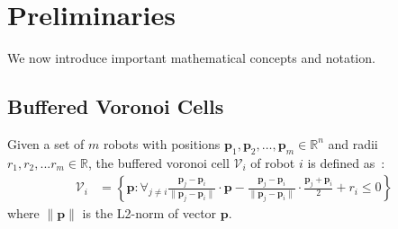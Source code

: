 \documentclass{svproc}
\newcommand{\vp}{\mathbf{p}}
\newcommand{\vf}{\mathbf{f}}
\newcommand{\vo}{\mathbf{o}}
\newcommand{\cV}{\mathcal{V}}
\newcommand{\cO}{\mathcal{O}}
\newcommand{\R}{\mathbb{R}} %
\begin{document}



\section{Preliminaries}

We now introduce important mathematical concepts and notation.

\subsection{Buffered Voronoi Cells} \label{bufferedVoronoi}
Given a set of $m$ robots with positions $\vp_1,\vp_2,\ldots,\vp_m \in \R^n$ and radii $r_1,r_2,...r_m \in \R$, the buffered voronoi cell $\cV_i$ of robot $i$ is defined as~\cite{bufferedVoronoiCells}:
\begin{align}
    \cV_i &= \left\{\vp : \forall_{j\neq i} \frac{\vp_j-\vp_i}{\|\vp_j-\vp_i\|}\cdot \vp - \frac{\vp_j-\vp_i}{\|\vp_j-\vp_i\|}\cdot \frac{\vp_j+\vp_i}{2} + r_i\leq 0 \right\} \label{voronoi_cell_definition}
\end{align}
where $\|\vp\|$ is the L2-norm of vector $\vp$.
\end{document}
